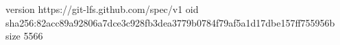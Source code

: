 version https://git-lfs.github.com/spec/v1
oid sha256:82acc89a92806a7dce3c928fb3dea3779b0784f79af5a1d17dbe157ff755956b
size 5566
